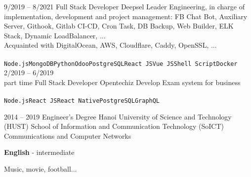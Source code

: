 \documentclass[9pt]{developercv} %
\begin{document}
\begin{entrylist}
	\entry
		{9/2019 -- 8/2021}
		{Full Stack Developer}
		{Deepsel}
		{Leader Engineering, in charge of implementation, development and project management: FB Chat Bot, Auxiliary Server, Githook, Gitlab CI-CD, Cron Task, DB Backup, Web Builder, ELK Stack, Dynamic LoadBalancer, ...\\
		Acquainted with DigitalOcean, AWS, Cloudflare, Caddy, OpenSSL, ...\\\\ \texttt{Node.js}\slashsep\texttt{MongoDB}\slashsep\texttt{Python}\slashsep\texttt{Odoo}\slashsep\texttt{PostgreSQL}\slashsep\texttt{React JS}\slashsep\texttt{Vue JS}\slashsep\texttt{Shell Script}\slashsep\texttt{Docker}}
	\entry
		{2/2019 -- 6/2019\\\footnotesize{part time}}
		{Full Stack Developer}
		{Opentechiz}
		{Develop Exam system for business \\\\ \texttt{Node.js}\slashsep\texttt{React JS}\slashsep\texttt{React Native}\slashsep\texttt{PostgreSQL}\slashsep\texttt{GraphQL}}
\end{entrylist}



\begin{entrylist}
	\entry
		{2014 -- 2019}
		{Engineer's Degree}
		{Hanoi University of Science and Technology (HUST)}
		{School of Information and Communication Technology (SoICT)\\
		Communications and Computer Networks}
\end{entrylist}


\begin{minipage}[t]{0.5\textwidth}
	\vspace{-\baselineskip} %

	
	\textbf{English} - intermediate
\end{minipage}
\hfill
\begin{minipage}[t]{0.5\textwidth}
	\vspace{-\baselineskip} %
	
	
	Music, movie, football...
\end{minipage}
\hfill

\end{document}

